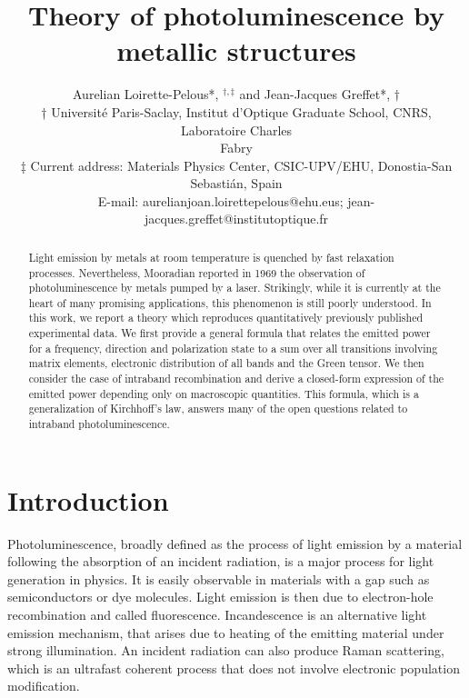 \documentclass[10pt]{article}
\title{Theory of photoluminescence by metallic structures }
\author{Aurelian Loirette-Pelous*, ${ }^{\dagger, \ddagger}$ and Jean-Jacques Greffet*, $\dagger$\\
† Université Paris-Saclay, Institut d'Optique Graduate School, CNRS, Laboratoire Charles\\
Fabry\\
‡ Current address: Materials Physics Center, CSIC-UPV/EHU, Donostia-San Sebastián, Spain\\
E-mail: aurelianjoan.loirettepelous@ehu.eus; jean-jacques.greffet@institutoptique.fr}
\date{}
\begin{document}
\maketitle
\captionsetup{singlelinecheck=false}


\begin{abstract}
Light emission by metals at room temperature is quenched by fast relaxation processes. Nevertheless, Mooradian reported in 1969 the observation of photoluminescence by metals pumped by a laser. Strikingly, while it is currently at the heart of many promising applications, this phenomenon is still poorly understood. In this work, we report a theory which reproduces quantitatively previously published experimental data. We first provide a general formula that relates the emitted power for a frequency, direction and polarization state to a sum over all transitions involving matrix elements, electronic distribution of all bands and the Green tensor. We then consider the case of intraband recombination and derive a closed-form expression of the emitted power depending only on macroscopic quantities. This formula, which is a generalization of Kirchhoff's law, answers many of the open questions related to intraband photoluminescence.
\end{abstract}

\section*{Introduction}
Photoluminescence, broadly defined as the process of light emission by a material following the absorption of an incident radiation, is a major process for light generation in physics. It is easily observable in materials with a gap such as semiconductors or dye molecules. Light emission is then due to electron-hole recombination and called fluorescence. Incandescence is an alternative light emission mechanism, that arises due to heating of the emitting material under strong illumination. An incident radiation can also produce Raman scattering, which is an ultrafast coherent process that does not involve electronic population modification.
\end{document}
